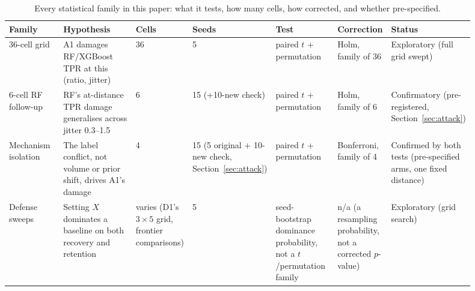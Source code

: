 \begin{table}[t]
  \centering
  \caption{Every statistical family in this paper: what it tests, how many cells, how corrected,
  and whether pre-specified.}
  \label{tab:stat-families}
  \small
  \setlength{\tabcolsep}{3pt}
  \begin{tabular}{p{0.15\linewidth}p{0.26\linewidth}p{0.045\linewidth}p{0.075\linewidth}p{0.165\linewidth}p{0.105\linewidth}p{0.1\linewidth}}
    \toprule
    Family & Hypothesis & Cells & Seeds & Test & Correction & Status \\
    \midrule
    36-cell grid & A1 damages RF/XGBoost TPR at this (ratio, jitter) & 36 & 5 & paired $t$ +
    permutation & Holm, family of 36 & Exploratory (full grid swept) \\
    6-cell RF follow-up & RF's at-distance TPR damage generalises across jitter 0.3--1.5 & 6 & 15
    (+10-new check) & paired $t$ + permutation & Holm, family of 6 & Confirmatory
    (pre-registered, Section~\ref{sec:attack}) \\
    Mechanism isolation & The label conflict, not volume or prior shift, drives A1's damage & 4
    & 15 (5 original + 10-new check, Section~\ref{sec:attack}) & paired $t$ + permutation &
    Bonferroni, family of 4 & Confirmed by both tests (pre-specified arms, one fixed distance) \\
    Defense sweeps & Setting $X$ dominates a baseline on both recovery and retention & varies
    (D1's $3\times5$ grid, frontier comparisons) & 5 & seed-bootstrap dominance probability, not
    a $t$/permutation family & n/a (a resampling probability, not a corrected $p$-value) &
    Exploratory (grid search) \\
    \bottomrule
  \end{tabular}
\end{table}

